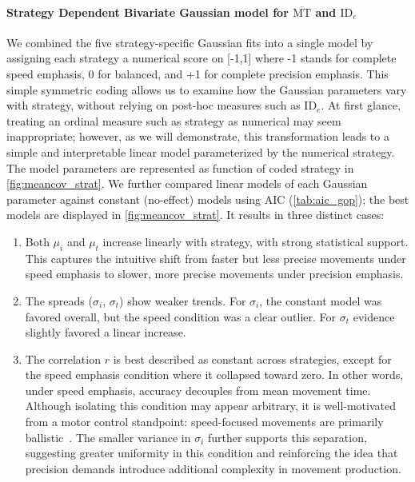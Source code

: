 \documentclass[acmlarge, manuscript,review]{acmart}
\newcommand{\mmt}{\ensuremath{\overline{\mt}}\xspace}
\newcommand{\mt}{\ensuremath{{\text{MT}}}\xspace}
\newcommand{\ide}{\ensuremath{{\text{ID}_e}}\xspace}
\begin{document}
\paragraph{Strategy Dependent Bivariate Gaussian model for \mmt and \ide}
We combined the five strategy-specific Gaussian fits into a single model by assigning each strategy a numerical score on [-1,1] where -1 stands for complete speed emphasis, 0 for balanced, and +1 for complete precision emphasis. This simple symmetric coding allows us to examine how the Gaussian parameters vary with strategy, without relying on post-hoc measures such as \ide.
At first glance, treating an ordinal measure such as strategy as numerical may seem inappropriate; however, as we will demonstrate, this transformation leads to a simple and interpretable linear model parameterized by the numerical strategy.
The model parameters are represented as function of coded strategy in \autoref{fig:meancov_strat}. We further compared linear models of each Gaussian parameter against constant (no-effect) models using AIC (\autoref{tab:aic_gop}); the best models are displayed in \autoref{fig:meancov_strat}. It results in three distinct cases:
\begin{enumerate}
  \item Both $\mu_i$ and $\mu_t$ increase linearly with strategy, with strong statistical support. This captures the intuitive shift from faster but less precise movements under speed emphasis to slower, more precise movements under precision emphasis.
  \item The spreads ($\sigma_i$, $\sigma_t$) show weaker trends. For $\sigma_i$, the constant model was favored overall, but the speed condition was a clear outlier. For $\sigma_t$ evidence slightly favored a linear increase.
  \item The correlation $r$ is best described as constant across strategies, except for the speed emphasis condition where it collapsed toward zero. In other words, under speed emphasis, accuracy decouples from mean movement time. Although isolating this condition may appear arbitrary, it is well-motivated from a motor control standpoint: speed-focused movements are primarily ballistic~\cite{elliott2017}. The smaller variance in $\sigma_i$ further supports this separation, suggesting greater uniformity in this condition and reinforcing the idea that precision demands introduce additional complexity in movement production.
\end{enumerate}
\end{document}
